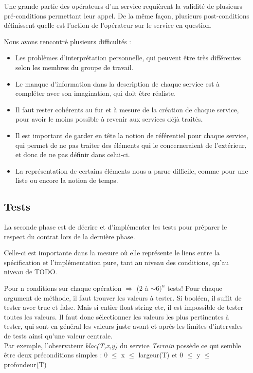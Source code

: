 \documentclass[a4paper, 11pt, notitlepage]{article}
\begin{document}
Une grande partie des opérateurs d'un service requièrent la validité de plusieurs pré-conditions permettant leur appel. De la même façon, plusieurs post-conditions définissent quelle est l'action de l'opérateur sur le service en question.

Nous avons rencontré plusieurs difficultés :
\begin{itemize}
\item Les problèmes d’interprétation personnelle, qui peuvent être
  très différentes selon les membres du groupe de travail.
\item Le manque d'information dans la description de chaque service
  est à compléter avec son imagination, qui doit être réaliste.
\item Il faut rester cohérents au fur et à mesure de la création de
  chaque service, pour avoir le moins possible à revenir aux services
  déjà traités. 
\item Il est important de garder en tête la notion de référentiel pour
  chaque service, qui permet de ne pas traiter des éléments qui
  le concerneraient de l'extérieur, et donc de ne pas définir dans celui-ci.

\item La représentation de certains éléments nous a parue difficile,
  comme pour une liste ou encore la notion de temps.
\end{itemize}

\subsection{Tests}
La seconde phase est de décrire et d'implémenter les tests pour préparer
le respect du contrat lors de la dernière phase.

Celle-ci est importante dans la mesure où elle représente le liens
entre la spécification et l'implémentation pure, tant au niveau des
conditions, qu'au niveau de TODO.

Pour n conditions sur chaque opération $\Rightarrow$ (2 à $\sim 6)^n$ tests!
Pour chaque argument de méthode, il faut trouver les valeurs à tester.
Si booléen, il suffit de tester avec true et false.
Mais si entier float string etc, il est impossible de tester toutes
les valeurs. Il faut donc sélectionner les valeurs les plus
pertinentes à tester, qui sont en général les valeurs juste avant et
après les limites d'intervales de tests ainsi qu'une valeur centrale. \\


Par exemple, l'observateur \emph{bloc(T,x,y)} du service \emph{Terrain} possède ce qui semble être deux préconditions simples :  0 $\le$ x $\le$ largeur(T) et 0 $\le$ y $\le$ profondeur(T) \\
\end{document}
